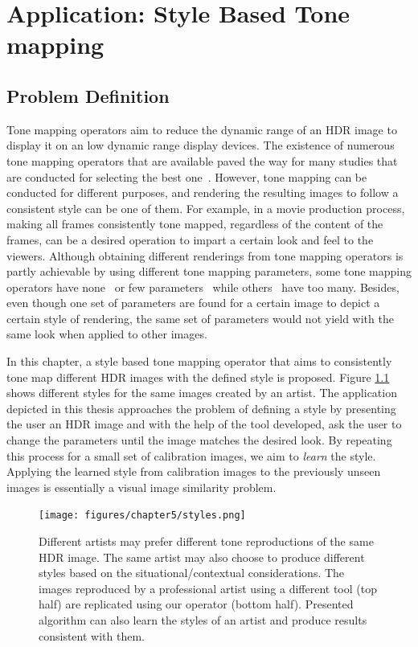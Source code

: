 \chapter{Application: Style Based Tone mapping}
\label{chp:b5}

\section{Problem Definition}

Tone mapping operators aim to reduce the dynamic range of an HDR image to display it on an low dynamic range display devices. The existence of numerous tone mapping operators that are available paved the way for many studies that are conducted for selecting the best one~\cite{parraga2018tone}. However, tone mapping can be conducted for different purposes, and rendering the resulting images to follow a consistent style can be one of them. For example, in a movie production process, making all frames consistently tone mapped, regardless of the content of the frames, can be a desired operation to impart a certain look and feel to the viewers. Although obtaining different renderings from tone mapping operators is partly achievable by using different tone mapping parameters, some tone mapping operators have none~\cite{Dura02} or few parameters~\cite{Fatt02} while others~\cite{Photomatix2010} have too many. Besides, even though one set of parameters are found for a certain image to depict a certain style of rendering, the same set of parameters would not yield with the same look when applied to other images. %

In this chapter, a style based tone mapping operator that aims to consistently tone map different HDR images with the defined style is proposed. Figure \ref{fig:styles} shows different styles for the same images created by an artist. The application depicted in this thesis approaches the problem of defining a style by presenting the user an HDR image and with the help of the tool developed, ask the user to change the parameters until the image matches the desired look. By repeating this process for a small set of calibration images, we aim to \emph{learn} the style. Applying the learned style from calibration images to the previously unseen images is essentially a visual image similarity problem.

\begin{figure}
\begin{center}
\texttt{[image: figures/chapter5/styles.png]}
\caption{Different artists may prefer different tone reproductions of the same HDR image. The same artist may also choose to produce different styles based on the situational/contextual considerations. The images reproduced by a professional artist using a different tool (top half) are replicated using our operator (bottom half). Presented algorithm can also learn the styles of an artist and produce results consistent with them.}
\label{fig:styles}
\end{center}
\end{figure}


